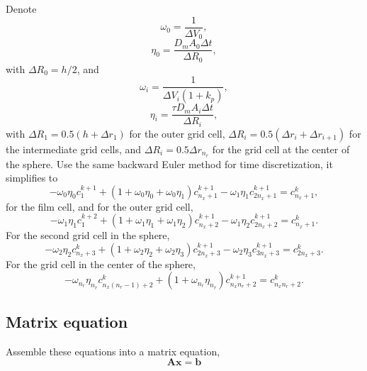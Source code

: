 \documentclass{article}
\begin{document}
Denote 
\begin{equation}
\omega_0 = \frac{1}{\Delta V_0},
\end{equation}
\begin{equation}
\eta_0 = \frac{D_mA_0\Delta t}{\Delta R_0}, 
\end{equation}
with $\Delta R_0 = h/2$, and 
\begin{equation}
\omega_i = \frac{1}{\Delta V_i (1+k_p)},
\end{equation}
\begin{equation}
\eta_i = \frac{\tau D_mA_i\Delta t}{\Delta R_i}, 
\end{equation}
with $\Delta R_1 = 0.5(h + \Delta r_1)$ for the outer grid cell, $\Delta R_i = 0.5 (\Delta r_i + \Delta r_{i+1})$ for the intermediate grid cells, and $\Delta R_i = 0.5 \Delta r_{n_r}$ for the grid cell at the center of the sphere. 
Use the same backward Euler method for time discretization, it simplifies to 
\begin{equation}
-\omega_0 \eta_0 c_1^{k+1}  + (1 + \omega_0\eta_0 + \omega_0\eta_1) c_{n_x+1}^{k+1} -  \omega_1 \eta_1 c_{2n_x+1}^{k+1} =   c_{n_x+1}^{k},
\end{equation}
for the film cell, and for the outer grid cell,
\begin{equation}
-\omega_1 \eta_1 c_1^{k+2}  + (1 + \omega_1\eta_1 + \omega_1\eta_2) c_{n_x+2}^{k+1} -  \omega_1 \eta_2 c_{2n_x+2}^{k+1} =   c_{n_x+1}^{k}.
\end{equation}
For the second grid cell in the sphere,
\begin{equation}
-\omega_2 \eta_2 c_{n_x+3}^{k} + (1 + \omega_2 \eta_2 + \omega_2 \eta_3)  c_{2n_x+3}^{k+1} -  \omega_2 \eta_3 c_{3n_x+3}^{k+1}=  c_{2n_x+3}^{k}.
\end{equation}
For the grid cell in the center of the sphere,
\begin{equation}
-\omega_{n_r} \eta_{n_r} c_{n_x(n_r-1)+2}^{k} +  (1 + \omega_{n_r} \eta_{n_r}) c_{n_xn_r+2}^{k+1} =  c_{n_xn_r+2}^{k}.
\end{equation}

\subsection{Matrix equation}
Assemble these equations into a matrix equation,
\begin{equation}
\mathbf{A}\mathbf{x}=\mathbf{b}
\end{equation}
\end{document}
